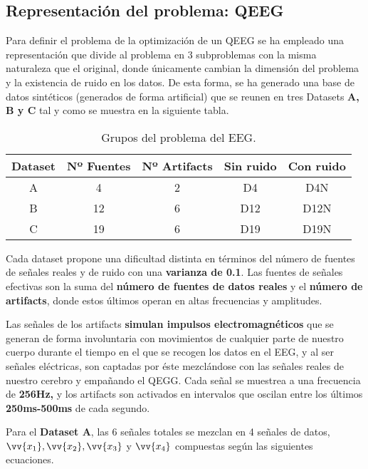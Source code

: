 \subsection{Representación del problema: QEEG}

Para definir el problema de la optimización de un QEEG se ha empleado una representación que divide al problema en 3 subproblemas con la misma naturaleza que el original, donde únicamente cambian la dimensión del problema y la existencia de ruido en los datos. De esta forma, se ha generado una base de datos sintéticos (generados de forma artificial) que se reunen en tres Datasets \textbf{A, B y C} tal y como se muestra en la siguiente tabla.

\begin{table}[htbp]
	\begin{center}
		\begin{tabular}{| c | c | c | c | c |}
			\hline
			Dataset& Nº Fuentes & Nº Artifacts & Sin ruido & Con ruido \\
			\hline \hline
			A & 4 & 2 & D4 & D4N\\ \hline
			B & 12 & 6 & D12 & D12N \\ \hline
			C & 19 & 6 & D19 & D19N \\ \hline
		\end{tabular}
		\caption{Grupos del problema del EEG.}
		\label{tabla:gruposEEG}
	\end{center}
\end{table}

Cada dataset propone una dificultad distinta en términos del número de fuentes de señales reales y de ruido con una \textbf{varianza de 0.1}. Las fuentes de señales efectivas son la suma del \textbf{número de fuentes de datos reales} y el \textbf{número de artifacts}, donde estos últimos operan en altas frecuencias y amplitudes. 

Las señales de los artifacts \textbf{simulan impulsos electromagnéticos} que se generan de forma involuntaria con movimientos de cualquier parte de nuestro cuerpo durante el tiempo en el que se recogen los datos en el EEG, y al ser señales eléctricas, son captadas por éste mezclándose con las señales reales de nuestro cerebro y empañando el QEGG. Cada señal se muestrea a una frecuencia de \textbf{256Hz,} y los artifacts son activados en intervalos que oscilan entre los últimos \textbf{250ms-500ms} de cada segundo. 

Para el \textbf{Dataset A}, las 6 señales totales se mezclan en 4 señales de datos, $\vv{x_1}, \vv{x_2}, \vv{x_3}$ y $ \vv{x_4} $ compuestas según las siguientes ecuaciones.

